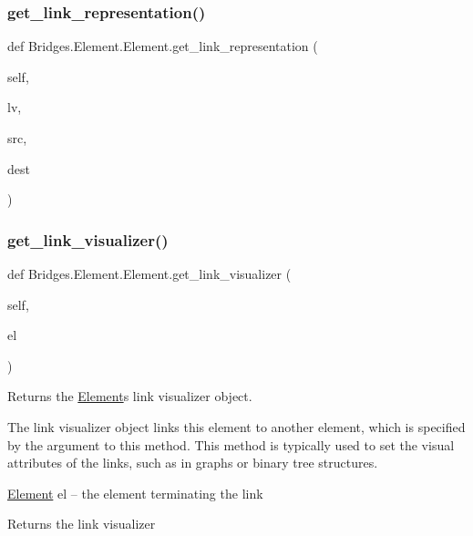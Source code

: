 \subsubsection{\texorpdfstring{get\+\_\+link\+\_\+representation()}{get\_link\_representation()}}
{\footnotesize\ttfamily def Bridges.\+Element.\+Element.\+get\+\_\+link\+\_\+representation (\begin{DoxyParamCaption}\item[{}]{self,  }\item[{}]{lv,  }\item[{}]{src,  }\item[{}]{dest }\end{DoxyParamCaption})}

\mbox{\label{class_bridges_1_1_element_1_1_element_ac1627e47169e665776a0df1a886432f8}} 
\subsubsection{\texorpdfstring{get\+\_\+link\+\_\+visualizer()}{get\_link\_visualizer()}}
{\footnotesize\ttfamily def Bridges.\+Element.\+Element.\+get\+\_\+link\+\_\+visualizer (\begin{DoxyParamCaption}\item[{}]{self,  }\item[{}]{el }\end{DoxyParamCaption})}



Returns the \mbox{\hyperlink{class_bridges_1_1_element_1_1_element}{Element}}\textquotesingle{}s link visualizer object. 

The link visualizer object links this element to another element, which is specified by the argument to this method. This method is typically used to set the visual attributes of the links, such as in graphs or binary tree structures.

\mbox{\hyperlink{class_bridges_1_1_element_1_1_element}{Element}} el -- the element terminating the link

\begin{DoxyReturn}{Returns}
the link visualizer 
\end{DoxyReturn}
\mbox{\label{class_bridges_1_1_element_1_1_element_a283e6a2d0715eea745ed4cdcc8fc2ea6}} 
